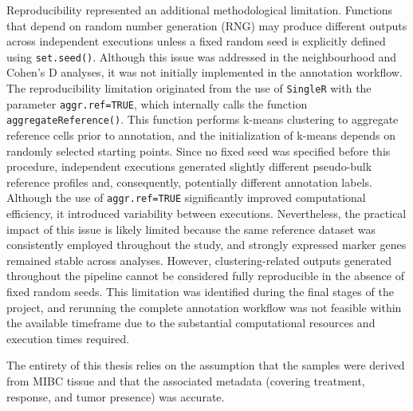 Reproducibility represented an additional methodological limitation. Functions that depend on random number generation (RNG) may produce different outputs across independent executions unless a fixed random seed is explicitly defined using \texttt{set.seed()}. Although this issue was addressed in the neighbourhood and Cohen’s D analyses, it was not initially implemented in the annotation workflow. The reproducibility limitation originated from the use of \texttt{SingleR} with the parameter \texttt{aggr.ref=TRUE}, which internally calls the function \texttt{aggregateReference()}. This function performs k-means clustering to aggregate reference cells prior to annotation, and the initialization of k-means depends on randomly selected starting points. Since no fixed seed was specified before this procedure, independent executions generated slightly different pseudo-bulk reference profiles and, consequently, potentially different annotation labels. Although the use of \texttt{aggr.ref=TRUE} significantly improved computational efficiency, it introduced variability between executions. Nevertheless, the practical impact of this issue is likely limited because the same reference dataset was consistently employed throughout the study, and strongly expressed marker genes remained stable across analyses. However, clustering-related outputs generated throughout the pipeline cannot be considered fully reproducible in the absence of fixed random seeds. This limitation was identified during the final stages of the project, and rerunning the complete annotation workflow was not feasible within the available timeframe due to the substantial computational resources and execution times required.

The entirety of this thesis relies on the assumption that the samples were derived from MIBC tissue and that the associated metadata (covering treatment, response, and tumor presence) was accurate.



